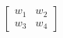 \documentclass[preview]{standalone}
\begin{document}
\begin{align*}
\begin{bmatrix} w_1 & w_2 \\ w_3 & w_4 \end{bmatrix}
\end{align*}
\end{document}
